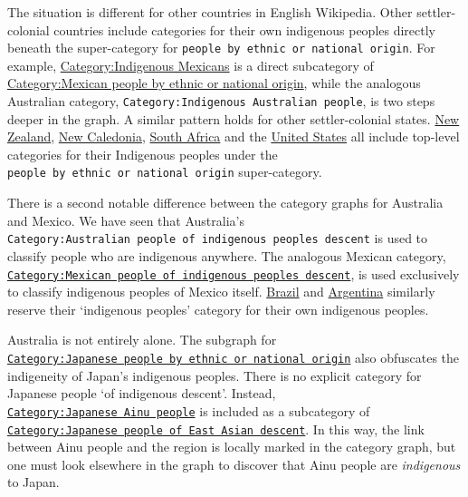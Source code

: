\documentclass[
  a4paper,
  DIV=11,
  numbers=noendperiod]{scrreprt}
\begin{document}
The situation is different for other countries in English Wikipedia.
Other settler-colonial countries include categories for their own
indigenous peoples directly beneath the super-category for
\texttt{people\ by\ ethnic\ or\ national\ origin}. For example,
\href{https://en.wikipedia.org/w/index.php?title=Category:Indigenous_Mexicans\&oldid=887057212}{Category:Indigenous
Mexicans} is a direct subcategory of
\href{https://en.wikipedia.org/w/index.php?title=Category:Mexican_people_by_ethnic_or_national_origin\&oldid=645962797}{Category:Mexican
people by ethnic or national origin}, while the analogous Australian
category, \texttt{Category:Indigenous\ Australian\ people}, is two steps
deeper in the graph. A similar pattern holds for other settler-colonial
states.
\href{https://en.wikipedia.org/wiki/Category:New_Zealand_people_by_ethnic_or_national_origin}{New
Zealand},
\href{https://en.wikipedia.org/wiki/Category:New_Caledonian_people_by_ethnic_or_national_origin}{New
Caledonia},
\href{https://en.wikipedia.org/wiki/Category:South_African_people_by_ethnic_or_national_origin}{South
Africa} and the
\href{https://en.wikipedia.org/wiki/Category:American_people_by_ethnic_or_national_origin}{United
States} all include top-level categories for their Indigenous peoples
under the \texttt{people\ by\ ethnic\ or\ national\ origin}
super-category.

There is a second notable difference between the category graphs for
Australia and Mexico. We have seen that Australia's
\texttt{Category:Australian\ people\ of\ indigenous\ peoples\ descent}
is used to classify people who are indigenous anywhere. The analogous
Mexican category,
\href{https://en.wikipedia.org/w/index.php?title=Category:Mexican_people_of_indigenous_peoples_descent\&oldid=812065156}{\texttt{Category:Mexican\ people\ of\ indigenous\ peoples\ descent}},
is used exclusively to classify indigenous peoples of Mexico itself.
\href{https://en.wikipedia.org/wiki/Category:Brazilian_people_by_ethnic_or_national_origin}{Brazil}
and
\href{https://en.wikipedia.org/wiki/Category:Brazilian_people_by_ethnic_or_national_origin}{Argentina}
similarly reserve their `indigenous peoples' category for their own
indigenous peoples.

Australia is not entirely alone. The subgraph for
\href{https://en.wikipedia.org/wiki/Category:Japanese_people_by_ethnic_or_national_origin}{\texttt{Category:Japanese\ people\ by\ ethnic\ or\ national\ origin}}
also obfuscates the indigeneity of Japan's indigenous peoples. There is
no explicit category for Japanese people `of indigenous descent'.
Instead,
\href{https://en.wikipedia.org/wiki/Category:Japanese_Ainu_people}{\texttt{Category:Japanese\ Ainu\ people}}
is included as a subcategory of
\href{https://en.wikipedia.org/wiki/Category:Japanese_people_of_East_Asian_descent}{\texttt{Category:Japanese\ people\ of\ East\ Asian\ descent}}.
In this way, the link between Ainu people and the region is locally
marked in the category graph, but one must look elsewhere in the graph
to discover that Ainu people are \emph{indigenous} to Japan.
\end{document}
